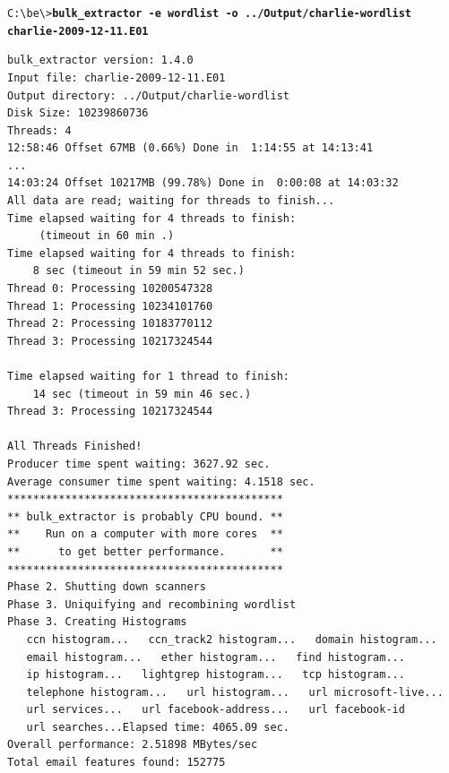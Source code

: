 \begingroup
\footnotesize
\texttt{C:\textbackslash be\textbackslash \textgreater \textbf{bulk\_extractor -e wordlist -o ../Output/charlie-wordlist charlie-2009-12-11.E01}}
\endgroup
\begingroup
\footnotesize
\begin{Verbatim}[fontfamily=courier, commandchars=\\\{\}]
bulk_extractor version: 1.4.0
Input file: charlie-2009-12-11.E01
Output directory: ../Output/charlie-wordlist
Disk Size: 10239860736
Threads: 4
12:58:46 Offset 67MB (0.66%) Done in  1:14:55 at 14:13:41
...
14:03:24 Offset 10217MB (99.78%) Done in  0:00:08 at 14:03:32
All data are read; waiting for threads to finish...
Time elapsed waiting for 4 threads to finish:
     (timeout in 60 min .)
Time elapsed waiting for 4 threads to finish:
    8 sec (timeout in 59 min 52 sec.)
Thread 0: Processing 10200547328
Thread 1: Processing 10234101760
Thread 2: Processing 10183770112
Thread 3: Processing 10217324544

Time elapsed waiting for 1 thread to finish:
    14 sec (timeout in 59 min 46 sec.)
Thread 3: Processing 10217324544

All Threads Finished!
Producer time spent waiting: 3627.92 sec.
Average consumer time spent waiting: 4.1518 sec.
*******************************************
** bulk_extractor is probably CPU bound. **
**    Run on a computer with more cores  **
**      to get better performance.       **
*******************************************
Phase 2. Shutting down scanners
Phase 3. Uniquifying and recombining wordlist
Phase 3. Creating Histograms
   ccn histogram...   ccn_track2 histogram...   domain histogram...
   email histogram...   ether histogram...   find histogram...
   ip histogram...   lightgrep histogram...   tcp histogram...
   telephone histogram...   url histogram...   url microsoft-live...
   url services...   url facebook-address...   url facebook-id
   url searches...Elapsed time: 4065.09 sec.
Overall performance: 2.51898 MBytes/sec
Total email features found: 152775
\end{Verbatim}
\endgroup

